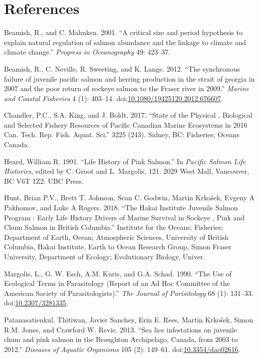 \documentclass[fleqn,10pt]{wlpeerj} %
\begin{document}
\section*{References}\label{references}

\hypertarget{refs}{}
\hypertarget{ref-Beamish2001}{}
Beamish, R., and C. Mahnken. 2001. ``A critical size and period
hypothesis to explain natural regulation of salmon abundance and the
linkage to climate and climate change.'' \emph{Progress in Oceanography}
49: 423--37.

\hypertarget{ref-Beamish2012}{}
Beamish, R., C. Neville, R. Sweeting, and K. Lange. 2012. ``The
synchronous failure of juvenile pacific salmon and herring production in
the strait of georgia in 2007 and the poor return of sockeye salmon to
the Fraser river in 2009.'' \emph{Marine and Coastal Fisheries} 4 (1):
403--14.
doi:\href{https://doi.org/10.1080/19425120.2012.676607}{10.1080/19425120.2012.676607}.

\hypertarget{ref-Chandler2017}{}
Chandler, P.C., S.A. King, and J. Boldt. 2017. ``State of the Physical ,
Biological and Selected Fishery Resources of Pacific Canadian Marine
Ecosystems in 2016 Can. Tech. Rep. Fish. Aquat. Sci.'' 3225 (243).
Sidney, BC: Fisheries; Oceans Canada.

\hypertarget{ref-Heard1991}{}
Heard, William R. 1991. ``Life History of Pink Salmon.'' In
\emph{Pacific Salmon Life Histories}, edited by C. Groot and L.
Margolis, 121. 2029 West Mall, Vancouver, BC V6T 1Z2: UBC Press.

\hypertarget{ref-Hunt2018}{}
Hunt, Brian P.V., Brett T. Johnson, Sean C. Godwin, Martin Krkošek,
Evgeny A Pakhomov, and Luke A Rogers. 2018. ``The Hakai Institute
Juvenile Salmon Program : Early Life History Drivers of Marine Survival
in Sockeye , Pink and Chum Salmon in British Columbia.'' Institute for
the Oceans; Fisheries; Department of Earth, Ocean; Atmospheric Sciences,
University of British Columbia, Hakai Institute, Earth to Ocean Research
Group, Simon Fraser University, Department of Ecology; Evolutionary
Biology, Univer.

\hypertarget{ref-Margolis1990}{}
Margolis, L., G. W. Esch, A.M. Kuris, and G.A. Schad. 1990. ``The Use of
Ecological Terms in Parasitology (Report of an Ad Hoc Committee of the
American Society of Parasitologists).'' \emph{The Journal of
Parisitology} 68 (1): 131--33.
doi:\href{https://doi.org/10.2307/3281335}{10.2307/3281335}.

\hypertarget{ref-Patanasatienkul2013}{}
Patanasatienkul, Thitiwan, Javier Sanchez, Erin E. Rees, Martin Krkošek,
Simon R.M. Jones, and Crawford W. Revie. 2013. ``Sea lice infestations
on juvenile chum and pink salmon in the Broughton Archipelago, Canada,
from 2003 to 2012.'' \emph{Diseases of Aquatic Organisms} 105 (2):
149--61. doi:\href{https://doi.org/10.3354/dao02616}{10.3354/dao02616}.
\end{document}

